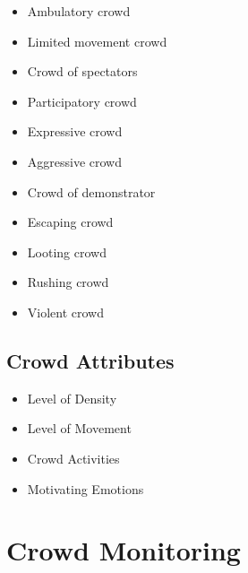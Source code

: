 \begin{itemize}
	\item Ambulatory crowd
	\item Limited movement crowd
	\item Crowd of spectators
	\item Participatory crowd
	\item Expressive crowd
	\item Aggressive crowd
	\item Crowd of demonstrator
	\item Escaping crowd
	\item Looting crowd
	\item Rushing crowd
	\item Violent crowd
\end{itemize}

\subsection{Crowd Attributes}

\begin{itemize}
	\item Level of Density
	\item Level of Movement
	\item Crowd Activities
	\item Motivating Emotions
\end{itemize}

\section{Crowd Monitoring}






